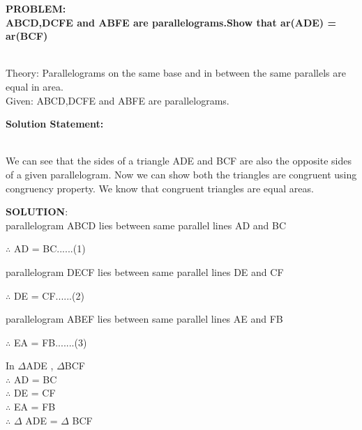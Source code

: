 \documentclass[10pt,a4paper]{report}
\begin{document}
\begin{multicols}{2}

\raggedright \textbf{PROBLEM:}\vspace{2mm}\\
\textbf{ABCD,DCFE and ABFE are parallelograms.Show that   ar(ADE) = ar(BCF)}
\vspace{0.5cm}\raggedright \\
Theory:
Parallelograms on the same base and in between the same parallels are equal in area.\\
Given: ABCD,DCFE and ABFE are parallelograms.
\vspace{2mm} \\ 
\raggedright \textbf{Solution Statement:}\vspace{2mm}
\raggedright \\We can see that the sides of a triangle ADE and BCF are also the opposite sides of a given parallelogram. Now we can show both the triangles are congruent using congruency property. We know that congruent triangles are equal areas.  \\
\vspace{5mm}
\raggedright \textbf{SOLUTION}:\vspace{2mm}\\
parallelogram ABCD  lies  between same parallel lines AD and BC\\
\begin{center}
$\therefore$ AD = BC......(1)\\ 
\end{center}
 parallelogram DECF  lies  between same parallel lines DE and CF\\
\begin{center}
$\therefore$ DE = CF......(2)\\ 
\end{center}
 parallelogram ABEF  lies  between same parallel lines AE and FB\\
\begin{center}
$\therefore$ EA = FB.......(3)\\
\end{center}
\begin{center}
In $\Delta$ADE , $\Delta$BCF\\
$\therefore$ AD = BC \\
$\therefore$ DE = CF \\
$\therefore$ EA = FB \\
$\therefore$ $\Delta$ ADE = $\Delta$ BCF\\


\end{center}
\end{multicols}
\end{document}
